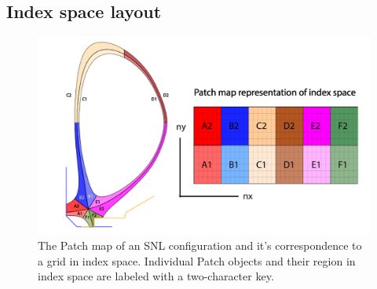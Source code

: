 \subsection{Index space layout}
\begin{figure}[H]
    \centering
    \includegraphics[width=\linewidth]{figures/patch_index_space.pdf}
    \caption{The Patch map of an SNL configuration and it's correspondence to a grid in index space. Individual Patch objects and their region in index space are labeled with a two-character key.}
    \label{fig:snl_patch_index_space}
\end{figure}